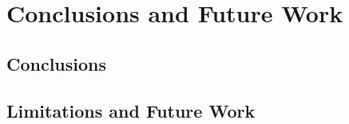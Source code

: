 \chapter{Conclusions and Future Work}
\label{chapt:conclusion}

\section{Conclusions}

{\todo}

\section{Limitations and Future Work}

{\todo}

